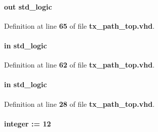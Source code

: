 \paragraph[{in\+\_\+pct\+\_\+full}]{ {\bfseries \textcolor{keywordflow}{out}\textcolor{vhdlchar}{ }} {\bfseries \textcolor{comment}{std\+\_\+logic}\textcolor{vhdlchar}{ }} \hspace{0.3cm}{\ttfamily [Port]}}\label{classtx__path__top_a178b9d9b3d5e363493d32dbceb85b15a}


Definition at line {\bf 65} of file {\bf tx\+\_\+path\+\_\+top.\+vhd}.

\paragraph[{in\+\_\+pct\+\_\+wrreq}]{ {\bfseries \textcolor{keywordflow}{in}\textcolor{vhdlchar}{ }} {\bfseries \textcolor{comment}{std\+\_\+logic}\textcolor{vhdlchar}{ }} \hspace{0.3cm}{\ttfamily [Port]}}\label{classtx__path__top_aa37a3c50e429b14602878ef5571e1903}


Definition at line {\bf 62} of file {\bf tx\+\_\+path\+\_\+top.\+vhd}.

\paragraph[{iq\+\_\+rdclk}]{ {\bfseries \textcolor{keywordflow}{in}\textcolor{vhdlchar}{ }} {\bfseries \textcolor{comment}{std\+\_\+logic}\textcolor{vhdlchar}{ }} \hspace{0.3cm}{\ttfamily [Port]}}\label{classtx__path__top_a29e2502906a94090a9e1147ab97ddb1e}


Definition at line {\bf 28} of file {\bf tx\+\_\+path\+\_\+top.\+vhd}.

\paragraph[{iq\+\_\+width}]{ {\bfseries \textcolor{vhdlchar}{ }} {\bfseries \textcolor{comment}{integer}\textcolor{vhdlchar}{ }\textcolor{vhdlchar}{ }\textcolor{vhdlchar}{\+:}\textcolor{vhdlchar}{=}\textcolor{vhdlchar}{ }\textcolor{vhdlchar}{ } \textcolor{vhdldigit}{12} \textcolor{vhdlchar}{ }} \hspace{0.3cm}{\ttfamily [Generic]}}\label{classtx__path__top_ad9eb9b875b008b241e3b7e7c8ff4b62a}


